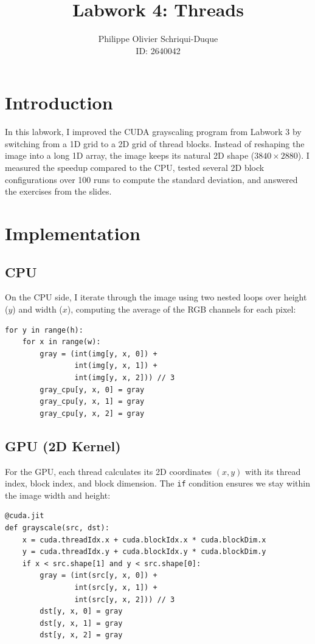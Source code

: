 \documentclass{report}
\begin{document}
\title{Labwork 4: Threads}
\author{Philippe Olivier Schriqui-Duque \\ ID: 2640042}
\date{}
\maketitle

\section*{Introduction}

In this labwork, I improved the CUDA grayscaling program from Labwork 3 by switching from a 1D grid to a 2D grid of thread blocks. Instead of reshaping the image into a long 1D array, the image keeps its natural 2D shape ($3840 \times 2880$). I measured the speedup compared to the CPU, tested several 2D block configurations over 100 runs to compute the standard deviation, and answered the exercises from the slides.

\section*{Implementation}

\subsection*{CPU}

On the CPU side, I iterate through the image using two nested loops over height ($y$) and width ($x$), computing the average of the RGB channels for each pixel:

\begin{verbatim}
for y in range(h):
    for x in range(w):
        gray = (int(img[y, x, 0]) +
                int(img[y, x, 1]) +
                int(img[y, x, 2])) // 3
        gray_cpu[y, x, 0] = gray
        gray_cpu[y, x, 1] = gray
        gray_cpu[y, x, 2] = gray
\end{verbatim}

\subsection*{GPU (2D Kernel)}

For the GPU, each thread calculates its 2D coordinates $(x, y)$ with its thread index, block index, and block dimension. The \texttt{if} condition ensures we stay within the image width and height:

\begin{verbatim}
@cuda.jit
def grayscale(src, dst):
    x = cuda.threadIdx.x + cuda.blockIdx.x * cuda.blockDim.x
    y = cuda.threadIdx.y + cuda.blockIdx.y * cuda.blockDim.y
    if x < src.shape[1] and y < src.shape[0]:
        gray = (int(src[y, x, 0]) +
                int(src[y, x, 1]) +
                int(src[y, x, 2])) // 3
        dst[y, x, 0] = gray
        dst[y, x, 1] = gray
        dst[y, x, 2] = gray
\end{verbatim}
\end{document}
